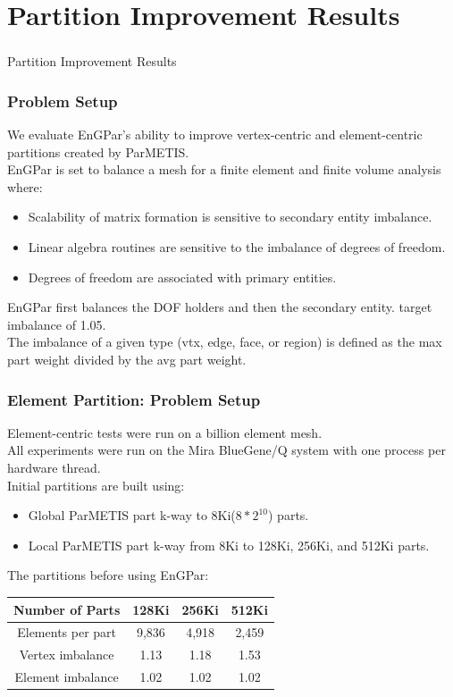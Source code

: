 \documentclass{beamer}
\begin{document}
\section{Partition Improvement Results}
\begin{frame}
  \frametitle{}
  \center \huge{Partition Improvement Results}
\end{frame}

\begin{frame}
  \frametitle{Problem Setup}
  We evaluate EnGPar's ability to improve vertex-centric
  and element-centric partitions created by ParMETIS.\\
  \medskip
  EnGPar is set to balance a mesh for a finite element and finite volume analysis where:
  \begin{itemize}
    \item Scalability of matrix formation is sensitive to secondary entity imbalance.
    \item Linear algebra routines are sensitive to the imbalance of degrees of freedom.
    \item Degrees of freedom are associated with primary entities.
  \end{itemize}
  \bigskip
  EnGPar first balances the DOF holders and then the secondary entity.
  target imbalance of 1.05. \\
  The imbalance of a given type (vtx, edge, face, or region) is defined as the 
  max part weight divided by the avg part weight.
\end{frame}

\begin{frame}
  \frametitle{Element Partition: Problem Setup}
  \medskip
  Element-centric tests were run on a billion element mesh. \\
  All experiments were run on the Mira BlueGene/Q system with one process per
  hardware thread. \\
  \smallskip
  Initial partitions are built using:
  \begin{itemize}
  \item Global ParMETIS part k-way to 8Ki($8*2^{10}$) parts.
  \item Local ParMETIS part k-way from 8Ki to 128Ki, 256Ki, and 512Ki parts.
  \end{itemize}
  The partitions before using EnGPar:\\
  \begin{table}[!h]
    \centering
    \begin{tabular}{||c|c|c|c||}
      \hline
      Number of Parts &128Ki&256Ki&512Ki \\
      \hline
      Elements per part & 9,836 & 4,918&2,459  \\
      \hline
      Vertex imbalance & 1.13 & 1.18 & 1.53 \\
      \hline
      Element imbalance & 1.02& 1.02& 1.02\\
      \hline
    \end{tabular}
  \end{table}
\end{frame}
\end{document}
